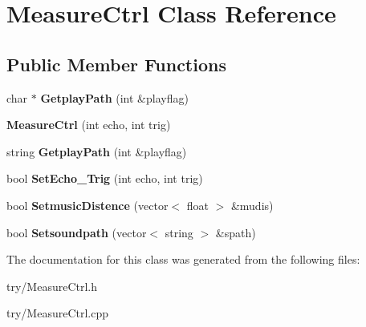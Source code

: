 \hypertarget{classMeasureCtrl}{}\section{Measure\+Ctrl Class Reference}
\label{classMeasureCtrl}
\subsection*{Public Member Functions}
\begin{DoxyCompactItemize}
\item 
\mbox{\label{classMeasureCtrl_a10d5064cee14874438ee93a96ac6f879}} 
char $\ast$ {\bfseries Getplay\+Path} (int \&playflag)
\item 
\mbox{\label{classMeasureCtrl_a7df3c46667ca317b1614d8f45e61280d}} 
{\bfseries Measure\+Ctrl} (int echo, int trig)
\item 
\mbox{\label{classMeasureCtrl_a10d5064cee14874438ee93a96ac6f879}} 
string {\bfseries Getplay\+Path} (int \&playflag)
\item 
\mbox{\label{classMeasureCtrl_a51206a90e016866167842dcdc8e64950}} 
bool {\bfseries Set\+Echo\+\_\+\+Trig} (int echo, int trig)
\item 
\mbox{\label{classMeasureCtrl_a3c420c5de5b7ac6540b353d317f2412e}} 
bool {\bfseries Setmusic\+Distence} (vector$<$ float $>$ \&mudis)
\item 
\mbox{\label{classMeasureCtrl_a3b834970207cb09d1f4e952d4dcb1c48}} 
bool {\bfseries Setsoundpath} (vector$<$ string $>$ \&spath)
\end{DoxyCompactItemize}


The documentation for this class was generated from the following files\+:\begin{DoxyCompactItemize}
\item 
try/Measure\+Ctrl.\+h\item 
try/Measure\+Ctrl.\+cpp\end{DoxyCompactItemize}
